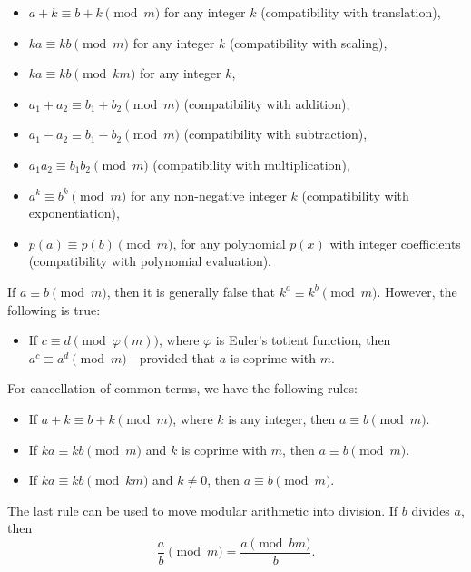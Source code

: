 \begin{itemize}
    \item \( a + k \equiv b + k \pmod{m} \) for any integer \( k \) (compatibility with translation),
    \item \( k a \equiv k b \pmod{m} \) for any integer \( k \) (compatibility with scaling),
    \item \( k a \equiv k b \pmod{k m} \) for any integer \( k \),
    \item \( a_1 + a_2 \equiv b_1 + b_2 \pmod{m} \) (compatibility with addition),
    \item \( a_1 - a_2 \equiv b_1 - b_2 \pmod{m} \) (compatibility with subtraction),
    \item \( a_1 a_2 \equiv b_1 b_2 \pmod{m} \) (compatibility with multiplication),
    \item \( a^k \equiv b^k \pmod{m} \) for any non-negative integer \( k \) (compatibility with exponentiation),
    \item \( p(a) \equiv p(b) \pmod{m} \), for any polynomial \( p(x) \) with integer coefficients (compatibility with polynomial evaluation).
\end{itemize}

If \( a \equiv b \pmod{m} \), then it is generally false that \( k^a \equiv k^b \pmod{m} \). However, the following is true:

\begin{itemize}
    \item If \( c \equiv d \pmod{\varphi(m)} \), where \( \varphi \) is Euler's totient function, then \( a^c \equiv a^d \pmod{m} \)—provided that \( a \) is coprime with \( m \).
\end{itemize}

For cancellation of common terms, we have the following rules:

\begin{itemize}
    \item If \( a + k \equiv b + k \pmod{m} \), where \( k \) is any integer, then \( a \equiv b \pmod{m} \).
    \item If \( k a \equiv k b \pmod{m} \) and \( k \) is coprime with \( m \), then \( a \equiv b \pmod{m} \).
    \item If \( k a \equiv k b \pmod{k m} \) and \( k \neq 0 \), then \( a \equiv b \pmod{m} \).
\end{itemize}

The last rule can be used to move modular arithmetic into division. If \( b \) divides \( a \), then 
\[
\frac{a}{b} \pmod{m} = \frac{a \pmod{bm}}{b}.
\]

